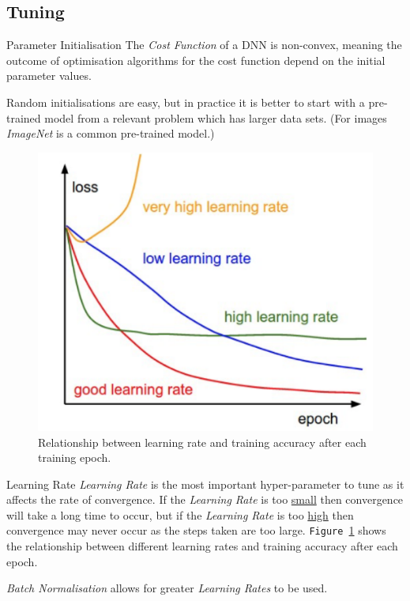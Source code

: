\documentclass[11pt,a4paper]{article}
\begin{document}
\subsection{Tuning}

  \begin{remark}{Parameter Initialisation}
    The \textit{Cost Function} of a DNN is non-convex, meaning the outcome of optimisation algorithms for the cost function depend on the initial parameter values.
    \par Random initialisations are easy, but in practice it is better to start with a pre-trained model from a relevant problem which has larger data sets. (For images \textit{ImageNet} is a common pre-trained model.)
  \end{remark}

  \begin{figure}[H]
    \begin{center}
      \includegraphics[width=.35\textwidth]{DifferentLearningRates.PNG}
    \end{center}
    \caption{ Relationship between learning rate and training accuracy after each training epoch. }
    \label{fig:Different_LRs}
  \end{figure}

  \begin{proposition}{Learning Rate}
    \textit{Learning Rate} is the most important hyper-parameter to tune as it affects the rate of convergence. If the \textit{Learning Rate} is too \underline{small} then convergence will take a long time to occur, but if the \textit{Learning Rate} is too \underline{high} then convergence may never occur as the steps taken are too large. \texttt{Figure \ref{fig:Different_LRs}} shows the relationship between different learning rates and training accuracy after each epoch.
    \par \textit{Batch Normalisation} allows for greater \textit{Learning Rates} to be used.
  \end{proposition}
\end{document}
